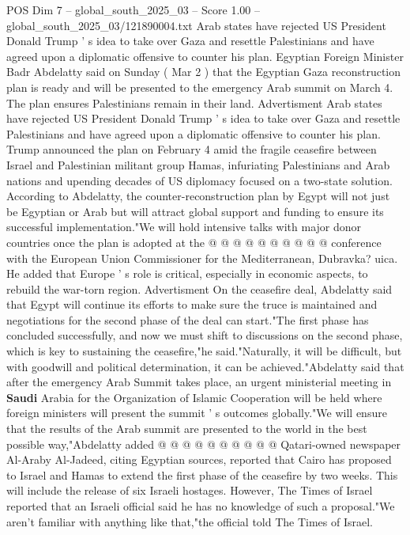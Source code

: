\begin{textsample}{POS Dim 7 – global\_south\_2025\_03 – Score 1.00 – global\_south\_2025\_03/121890004.txt}  \label{ex:f7_pos_097}
Arab states have rejected US President Donald Trump ' s idea to take over Gaza and resettle Palestinians and have agreed upon a diplomatic offensive to counter his plan.
Egyptian Foreign Minister Badr Abdelatty said on Sunday ( Mar 2 ) that the Egyptian Gaza reconstruction plan is ready and will be presented to the emergency Arab summit on March 4.
The plan ensures Palestinians remain in their land.
Advertisment Arab states have rejected US President Donald Trump ' s idea to take over Gaza and resettle Palestinians and have agreed upon a diplomatic offensive to counter his plan.
Trump announced the plan on February 4 amid the fragile ceasefire between Israel and Palestinian militant group Hamas, infuriating Palestinians and Arab nations and upending decades of US diplomacy focused on a two-state solution.
According to Abdelatty, the counter-reconstruction plan by Egypt will not just be Egyptian or Arab but will attract global support and funding to ensure its successful implementation."We will hold intensive talks with major donor countries once the plan is adopted at the @ @ @ @ @ @ @ @ @ @ conference with the European Union Commissioner for the Mediterranean, Dubravka? uica.
He added that Europe ' s role is critical, especially in economic aspects, to rebuild the war-torn region.
Advertisment On the ceasefire deal, Abdelatty said that Egypt will continue its efforts to make sure the truce is maintained and negotiations for the second phase of the deal can start."The first phase has concluded successfully, and now we must shift to discussions on the second phase, which is key to sustaining the ceasefire,"he said."Naturally, it will be difficult, but with goodwill and political determination, it can be achieved."Abdelatty said that after the emergency Arab Summit takes place, an urgent ministerial meeting in \textbf{Saudi} Arabia for the Organization of Islamic Cooperation will be held where foreign ministers will present the summit ' s outcomes globally."We will ensure that the results of the Arab summit are presented to the world in the best possible way,"Abdelatty added @ @ @ @ @ @ @ @ @ @ Qatari-owned newspaper Al-Araby Al-Jadeed, citing Egyptian sources, reported that Cairo has proposed to Israel and Hamas to extend the first phase of the ceasefire by two weeks.
This will include the release of six Israeli hostages.
However, The Times of Israel reported that an Israeli official said he has no knowledge of such a proposal."We aren't familiar with anything like that,"the official told The Times of Israel.

\end{textsample}
